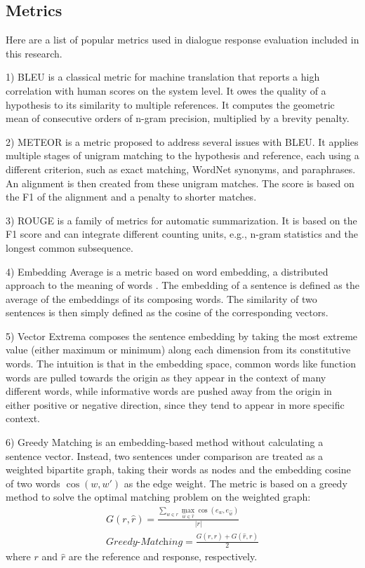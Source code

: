\documentclass[conference]{IEEEtran}
\begin{document}
    \subsection{Metrics}
    Here are a list of popular metrics used in dialogue response evaluation included in this research.

    1) BLEU \cite{BLEU} is a classical metric for machine translation that reports a high correlation with human scores on the system level. It owes the quality of a hypothesis to its similarity to multiple references. It computes the geometric mean of consecutive orders of n-gram precision, multiplied by a brevity penalty.

    2) METEOR \cite{METEOR} is a metric proposed to address several issues with BLEU. It applies multiple stages of unigram matching to the hypothesis and reference, each using a different criterion, such as exact matching, WordNet synonyms, and paraphrases. An alignment is then created from these unigram matches. The score is based on the F1 of the alignment and a penalty to shorter matches.

    3) ROUGE \cite{ROUGE} is a family of metrics for automatic summarization. It is based on the F1 score and can integrate different counting units, e.g., n-gram statistics and the longest common subsequence.

    4) Embedding Average is a metric based on word embedding, a distributed approach to the meaning of words \cite{word2vec}. The embedding of a sentence is defined as the average of the embeddings of its composing words. The similarity of two sentences is then simply defined as the cosine of the corresponding vectors.

    5) Vector Extrema \cite{Vector_Extrema} composes the sentence embedding by taking the most extreme value (either maximum or minimum) along each dimension from its constitutive words. The intuition is that in the embedding space, common words like function words are pulled towards the origin as they appear in the context of many different words, while informative words are pushed away from the origin in either positive or negative direction, since they tend to appear in more specific context.

    6) Greedy Matching \cite{GreedyAndOptimal} is an embedding-based method without calculating a sentence vector. Instead, two sentences under comparison are treated as a weighted bipartite graph, taking their words as nodes and the embedding cosine of two words $\cos(w, w')$ as the edge weight. The metric is based on a greedy method to solve the optimal matching problem on the weighted graph:
    \begin{align}
        G(r, \hat{r}) = \frac{
        \sum_{w \in r} \max_{\hat{w} \in \hat{r}} \cos(e_w, e_{\hat{w}})
        }{ |r| } \\
        \textit{Greedy-Matching} = \frac{
        G(r, \hat{r}) + G(\hat{r}, r)
        }{2}
    \end{align}
    where $r$ and $\hat{r}$ are the reference and response, respectively.
\end{document}
